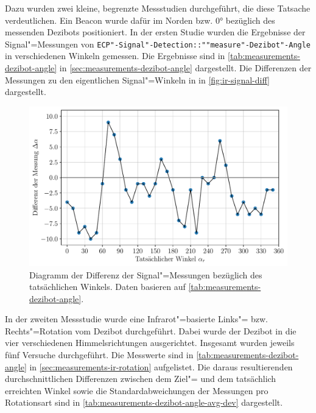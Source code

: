 {Dazu wurden zwei kleine, begrenzte Messstudien durchgeführt, die diese Tatsache verdeutlichen. Ein Beacon wurde dafür im Norden bzw. 0° bezüglich des messenden Dezibots positioniert. In der ersten Studie wurden die Ergebnisse der Signal"=Messungen von \texttt{ECP"-Signal"-Detection::""measure"-Dezibot"-Angle} in verschiedenen Winkeln gemessen. Die Ergebnisse sind in \autoref{tab:measurements-dezibot-angle} in \autoref{sec:measurements-dezibot-angle} dargestellt. Die Differenzen der Messungen zu den eigentlichen Signal"=Winkeln in in \autoref{fig:ir-signal-diff} dargestellt.

\begin{figure}[h]
    \centering
    \includegraphics[width=\textwidth]{../plot/ir_signal_diff.pdf}
    \caption{Diagramm der Differenz der Signal"=Messungen bezüglich des tatsächlichen Winkels. Daten basieren auf \autoref{tab:measurements-dezibot-angle}.}
    \label{fig:ir-signal-diff}
\end{figure}

In der zweiten Messstudie wurde eine Infrarot"=basierte Links"= bzw. Rechts"=Rotation vom Dezibot durchgeführt. Dabei wurde der Dezibot in die vier verschiedenen Himmelsrichtungen ausgerichtet. Insgesamt wurden jeweils fünf Versuche durchgeführt. Die Messwerte sind in \autoref{tab:measurements-dezibot-angle} in \autoref{sec:measurements-ir-rotation} aufgelistet. Die daraus resultierenden durchschnittlichen Differenzen zwischen dem Ziel"= und dem tatsächlich erreichten Winkel sowie die Standardabweichungen der Messungen pro Rotationsart sind in \autoref{tab:measurements-dezibot-angle-avg-dev} dargestellt.

\begin{table}[h]
    \centering
    
    \caption{Durchschnittliche Differenzen vom Ziel"= und dem tatsächlich erreichten Winkel sowie Standardabweichungen der Messungen pro Rotationsart von Links"= (L) und Rechts"=Rotationen (R) basierend auf den Daten aus \autoref{tab:measurements-dezibot-angle}.}
    \label{tab:measurements-dezibot-angle-avg-dev}
\end{table}

}
